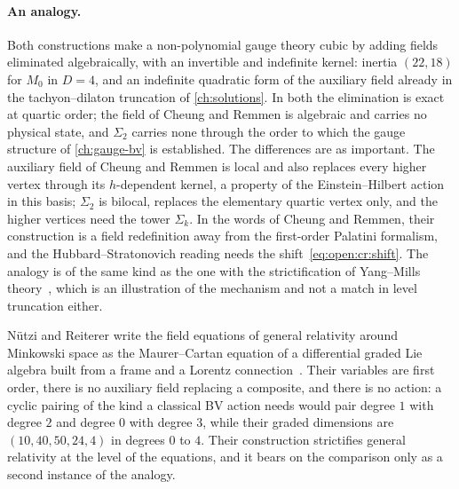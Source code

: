 \paragraph{An analogy.}
Both constructions make a non-polynomial gauge theory cubic by adding fields eliminated algebraically, with an invertible and indefinite kernel: inertia $(22, 18)$ for $M_0$ in $D = 4$, and an indefinite quadratic form of the auxiliary field already in the tachyon--dilaton truncation of \cref{ch:solutions}.
In both the elimination is exact at quartic order; the field of Cheung and Remmen is algebraic and carries no physical state, and $\Sigma_2$ carries none through the order to which the gauge structure of \cref{ch:gauge-bv} is established.
The differences are as important.
The auxiliary field of Cheung and Remmen is local and also replaces every higher vertex through its $h$-dependent kernel, a property of the Einstein--Hilbert action in this basis; $\Sigma_2$ is bilocal, replaces the elementary quartic vertex only, and the higher vertices need the tower $\Sigma_k$.
In the words of Cheung and Remmen, their construction is a field redefinition away from the first-order Palatini formalism, and the Hubbard--Stratonovich reading needs the shift~\eqref{eq:open:cr:shift}.
The analogy is of the same kind as the one with the strictification of Yang--Mills theory~\cite{Borsten:2021:DoubleCopyHomotopy}, which is an illustration of the mechanism and not a match in level truncation either.

Nützi and Reiterer write the field equations of general relativity around Minkowski space as the Maurer--Cartan equation of a differential graded Lie algebra built from a frame and a Lorentz connection~\cite{Nutzi:2018:ScatteringAmplitudesYM}.
Their variables are first order, there is no auxiliary field replacing a composite, and there is no action: a cyclic pairing of the kind a classical BV action needs would pair degree $1$ with degree $2$ and degree $0$ with degree $3$, while their graded dimensions are $(10, 40, 50, 24, 4)$ in degrees $0$ to $4$.
Their construction strictifies general relativity at the level of the equations, and it bears on the comparison only as a second instance of the analogy.
